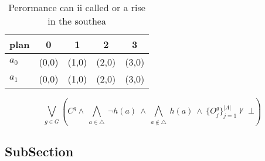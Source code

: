\documentclass[a4paper]{article}
\begin{document}
\begin{table}
\begin{adjustbox}{width=0.7\columnwidth}
\begin{tabular}{|l|l|l|l|l|}
\hline
\textbf{plan} & \multicolumn{1}{c|}{\textbf{0}} & \multicolumn{1}{c|}{\textbf{1}} & \multicolumn{1}{c|}{\textbf{2}} & \multicolumn{1}{c|}{\textbf{3}} \\ \hline
\textbf{$a_0$}  & (0,0) & (1,0) & (2,0) & (3,0) \\ \hline
\textbf{$a_1$}  & (0,0) & (1,0) & (2,0) & (3,0) \\ \hline
\end{tabular}
\end{adjustbox}
\caption{Perormance can ii called or a rise in the southea
}
\end{table}

\[\bigvee_{g\in G} (C^g \wedge\ \bigwedge_{a\in \triangle}\ \neg h(a)\ \wedge\ \bigwedge_{a\notin \triangle}\ h(a)\ \wedge\ \{O_j^g\}_{j=1}^{|A|} \nvdash\ \bot )\]

\subsection{SubSection}
\end{document}
